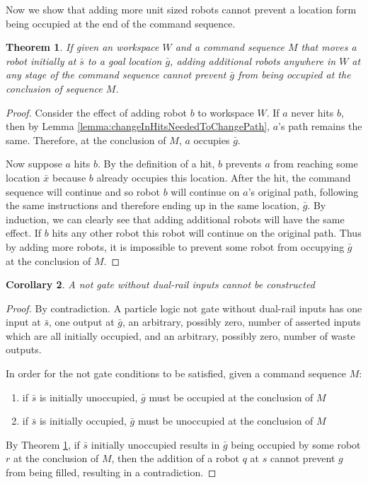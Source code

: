 \documentclass[letterpaper, 10 pt, conference]{ieeeconf}
\newtheorem{theorem}{Theorem}
\newtheorem{corollary}[theorem]{Corollary}
\begin{document}
Now we show that adding more unit sized robots cannot prevent a location form being occupied at the end of the command sequence.

\begin{theorem}\label{thm:AdditionalRobotsCannotPreventAnOccupation}
If given an workspace $W$ and a command sequence $M$ that moves a robot initially at $\bar{s}$ to a goal location $\bar{g}$, adding additional robots anywhere in $W$ at any stage of the command sequence cannot prevent $\bar{g}$ from being occupied at the conclusion of sequence $M$.
\end{theorem}

\begin{proof} 

Consider the effect of adding robot $b$ to workspace $W$. If $a$ never hits $b$, then by Lemma \ref{lemma:changeInHitsNeededToChangePath}, $a$'s path remains the same. Therefore, at the conclusion of $M$, $a$ occupies $\bar{g}$. 

Now suppose $a$ hits $b$. By the definition of a hit, $b$ prevents $a$ from reaching some location $\bar{x}$ because $b$ already occupies this location. After the hit, the command sequence will continue and so robot $b$ will continue on $a$'s original path, following the same instructions and therefore ending up in the same location, $\bar{g}$. By induction, we can clearly see that adding additional robots will have the same effect. If $b$ hits any other robot this robot will continue on the original path. Thus by adding more robots, it is impossible to prevent some robot from occupying $\bar{g}$ at the conclusion of $M$.  
\end{proof}

\begin{corollary}
A  {\sc not} gate without dual-rail inputs cannot be constructed
\end{corollary}
\begin{proof}
By contradiction.
A particle logic {\sc not} gate without dual-rail inputs has one input at $\bar{s}$, one output at $\bar{g}$, an arbitrary, possibly zero, number of asserted inputs which are all initially occupied, and an arbitrary, possibly zero, number of waste outputs.

In order for the {\sc not} gate conditions to be satisfied, given a command sequence $M$:  
\begin{enumerate}
\item if $\bar{s}$ is initially unoccupied, $\bar{g}$ must be occupied at the conclusion of $M$
\item if $\bar{s}$ is initially occupied, $\bar{g}$ must be unoccupied at the conclusion of $M$ 
\end{enumerate}
By Theorem \ref{thm:AdditionalRobotsCannotPreventAnOccupation}, if $\bar{s}$ initially unoccupied results in $\bar{g}$ being occupied by some robot $r$ at the conclusion of $M$, then the addition of a robot $q$ at $s$ cannot prevent $g$ from being filled, resulting in a contradiction.
\end{proof}
\end{document}
